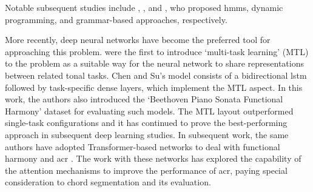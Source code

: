 


Notable subsequent studies include
\textcite{raphael2004functional},
\textcite{illescas2007harmonic}, and
\textcite{magalhaes2011functional}, who proposed
\glspl{hmm}, dynamic programming, and grammar-based
approaches, respectively.


More recently, deep neural networks have become the
preferred tool for approaching this problem.
\textcite{chen2018functional} were the first to introduce
`multi-task learning' (MTL) \parencite{ruder2017overview} to
the problem as a suitable way for the neural network to
share representations between related tonal tasks. Chen and
Su's model consists of a bidirectional \gls{lstm}
\parencite{hochreiter1997long} followed by task-specific
dense layers, which implement the MTL aspect. In this work,
the authors also introduced the `Beethoven Piano Sonata
Functional Harmony' dataset for evaluating such models. The
MTL layout outperformed single-task configurations and it
has continued to prove the best-performing approach in
subsequent deep learning studies. In subsequent work, the
same authors have adopted Transformer-based networks to deal
with functional harmony and \gls{acr}
\parencite{chen2019harmony, chen2021attend}. The work with
these networks has explored the capability of the attention
mechanisms to improve the performance of \gls{acr}, paying
special consideration to chord segmentation and its
evaluation.


